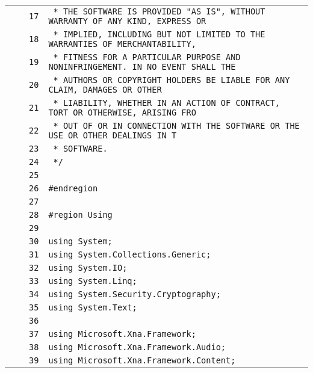 \documentclass[a4paper,10pt]{article}
\begin{document}
\begin{longtable}[l]{lrrl}
\cellcolor{gray} &  & \verb~17~ & \verb~ * THE SOFTWARE IS PROVIDED "AS IS", WITHOUT WARRANTY OF ANY KIND, EXPRESS OR~\\
\cellcolor{gray} &  & \verb~18~ & \verb~ * IMPLIED, INCLUDING BUT NOT LIMITED TO THE WARRANTIES OF MERCHANTABILITY,~\\
\cellcolor{gray} &  & \verb~19~ & \verb~ * FITNESS FOR A PARTICULAR PURPOSE AND NONINFRINGEMENT. IN NO EVENT SHALL THE~\\
\cellcolor{gray} &  & \verb~20~ & \verb~ * AUTHORS OR COPYRIGHT HOLDERS BE LIABLE FOR ANY CLAIM, DAMAGES OR OTHER~\\
\cellcolor{gray} &  & \verb~21~ & \verb~ * LIABILITY, WHETHER IN AN ACTION OF CONTRACT, TORT OR OTHERWISE, ARISING FRO~\\
\cellcolor{gray} &  & \verb~22~ & \verb~ * OUT OF OR IN CONNECTION WITH THE SOFTWARE OR THE USE OR OTHER DEALINGS IN T~\\
\cellcolor{gray} &  & \verb~23~ & \verb~ * SOFTWARE.~\\
\cellcolor{gray} &  & \verb~24~ & \verb~ */~\\
\cellcolor{gray} &  & \verb~25~ & \verb~~\\
\cellcolor{gray} &  & \verb~26~ & \verb~#endregion~\\
\cellcolor{gray} &  & \verb~27~ & \verb~~\\
\cellcolor{gray} &  & \verb~28~ & \verb~#region Using~\\
\cellcolor{gray} &  & \verb~29~ & \verb~~\\
\cellcolor{gray} &  & \verb~30~ & \verb~using System;~\\
\cellcolor{gray} &  & \verb~31~ & \verb~using System.Collections.Generic;~\\
\cellcolor{gray} &  & \verb~32~ & \verb~using System.IO;~\\
\cellcolor{gray} &  & \verb~33~ & \verb~using System.Linq;~\\
\cellcolor{gray} &  & \verb~34~ & \verb~using System.Security.Cryptography;~\\
\cellcolor{gray} &  & \verb~35~ & \verb~using System.Text;~\\
\cellcolor{gray} &  & \verb~36~ & \verb~~\\
\cellcolor{gray} &  & \verb~37~ & \verb~using Microsoft.Xna.Framework;~\\
\cellcolor{gray} &  & \verb~38~ & \verb~using Microsoft.Xna.Framework.Audio;~\\
\cellcolor{gray} &  & \verb~39~ & \verb~using Microsoft.Xna.Framework.Content;~\\

\end{longtable}
\end{document}
